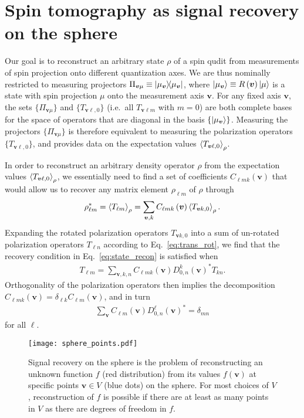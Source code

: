 \documentclass[nofootinbib,twocolumn]{revtex4-1}
\newcommand{\p}[1]{\left(#1\right)} %
\newcommand{\bk}{\Braket} %
\renewcommand{\set}[1]{\{#1\}} %
\begin{document}
\section{Spin tomography as signal recovery on the sphere}
\label{sec:signal_recovery}

Our goal is to reconstruct an arbitrary state $\rho$ of a spin qudit from measurements of spin projection onto different quantization axes.
We are thus nominally restricted to measuring projectors $\Pi_{\bm v\mu} \equiv \op{\mu_{\bm v}}$, where $\ket{\mu_{\bm v}}\equiv R\p{\bm v}\ket{\mu}$ is a state with spin projection $\mu$ onto the measurement axis $\bm v$.
For any fixed axis $\bm v$, the sets $\set{\Pi_{\bm v\mu}}$ and $\set{T_{\bm v\ell,0}}$ (i.e.~all $T_{\bm v\ell m}$ with $m=0$) are both complete bases for the space of operators that are diagonal in the basis $\set{\ket{\mu_{\bm v}}}$.
Measuring the projectors $\set{\Pi_{\bm v\mu}}$ is therefore equivalent to measuring the polarization operators $\set{T_{\bm v\ell,0}}$, and provides data on the expectation values $\bk{T_{\bm v\ell,0}}_\rho$.

In order to reconstruct an arbitrary density operator $\rho$ from the expectation values $\bk{T_{\bm v\ell,0}}_\rho$, we essentially need to find a set of coefficients $C_{\ell mk}\p{\bm v}$ that would allow us to recover any matrix element $\rho_{\ell m}$ of $\rho$ through
\begin{align}
  \rho_{\ell m}^* = \bk{T_{\ell m}}_\rho
  = \sum_{\bm v,k} C_{\ell mk}\p{\bm v} \bk{T_{\bm vk,0}}_\rho.
  \label{eq:state_recon}
\end{align}
Expanding the rotated polarization operators $T_{\bm vk,0}$ into a sum of un-rotated polarization operators $T_{\ell n}$ according to Eq.~\eqref{eq:trans_rot}, we find that the recovery condition in Eq.~\eqref{eq:state_recon} is satisfied when
\begin{align}
  T_{\ell m}
  = \sum_{\bm v,k,n} C_{\ell mk}\p{\bm v} D^k_{0,n}\p{\bm v}^* T_{kn}.
\end{align}
Orthogonality of the polarization operators then implies the decomposition $C_{\ell mk}\p{\bm v}=\delta_{\ell k}C_{\ell m}\p{\bm v}$, and in turn
\begin{align}
  \sum_{\bm v} C_{\ell m}\p{\bm v} D^\ell_{0,n}\p{\bm v}^*
  = \delta_{mn}
  \label{eq:tomo_recovery}
\end{align}
for all $\ell$.

\begin{figure}
  \centering
  \texttt{[image: sphere\_points.pdf]}
  \caption{Signal recovery on the sphere is the problem of reconstructing an unknown function $f$ (red distribution) from its values $f\p{\bm v}$ at specific points $\bm v\in V$ (blue dots) on the sphere.
    For most choices of $V$, reconstruction of $f$ is possible if there are at least as many points in $V$ as there are degrees of freedom in $f$.}
  \label{fig:sphere_points}
\end{figure}
\end{document}
